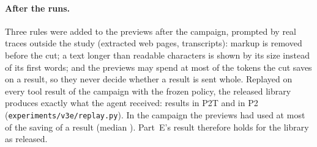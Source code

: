 \paragraph{After the runs.} Three rules were added to the previews after the campaign, prompted by real traces
outside the study (extracted web pages, transcripts): markup is removed before the cut; a text longer than
\SfourETextLong{} readable characters is shown by its size instead of its first words; and the previews may spend
at most \SfourEShareBound{} of the tokens the cut saves on a result, so they never decide whether a result is sent
whole. Replayed on every tool result of the campaign with the frozen policy, the released library produces exactly
what the agent received: \SfourEReplayPtwoT{} results in P2T and \SfourEReplayPtwo{} in P2
(\texttt{experiments/v3e/replay.py}). In the campaign the previews had used at most \SfourEShareMax{} of the saving
of a result (median \SfourEShareMedian{}). Part~E's result therefore holds for the library as released.

